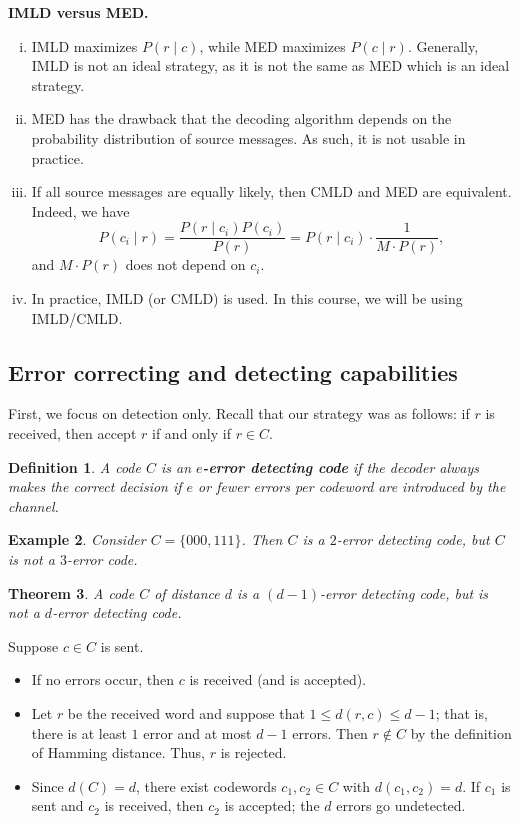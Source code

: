\documentclass[10pt]{article}
\makeatletter
\theoremstyle{newstyle}
\newtheorem{thm}{Theorem}[subsection]
\newtheorem{defn}[thm]{Definition}
\newtheorem{exmp}[thm]{Example}
\newenvironment{pf}[1][\proofname]{\par
  \pushQED{\qed}%
  \normalfont \topsep0\p@\relax
  \trivlist
  \item[\hskip\labelsep\scshape
  #1\@addpunct{.}]\ignorespaces
}{%
  \popQED\endtrivlist\@endpefalse
}
\makeatother
\begin{document}
{\bf IMLD versus MED.}
\begin{enumerate}[(i)]
    \item IMLD maximizes $P(r \mid c)$, while MED maximizes $P(c \mid r)$. Generally, 
    IMLD is not an ideal strategy, as it is not the same as MED which is an ideal strategy.
    \item MED has the drawback that the decoding algorithm depends on the probability 
    distribution of source messages. As such, it is not usable in practice. 
    \item If all source messages are equally likely, then CMLD and MED are equivalent. 
    Indeed, we have 
    \[ P(c_i \mid r) = \frac{P(r \mid c_i) P(c_i)}{P(r)} = P(r \mid c_i) \cdot \frac{1}{M \cdot P(r)}, \]
    and $M \cdot P(r)$ does not depend on $c_i$.
    \item In practice, IMLD (or CMLD) is used. In this course, we will be using IMLD/CMLD.
\end{enumerate}

\subsection{Error correcting and detecting capabilities}

First, we focus on detection only. Recall that our strategy was as follows: 
if $r$ is received, then accept $r$ if and only if $r \in C$. 

\begin{defn}
A code $C$ is an {\bf $e$-error detecting code} if the decoder always makes the correct decision
if $e$ or fewer errors per codeword are introduced by the channel. 
\end{defn}

\begin{exmp}
Consider $C = \{000, 111\}$. Then $C$ is a $2$-error detecting code, but $C$ is not a 
$3$-error code. 
\end{exmp}

\begin{thm}
A code $C$ of distance $d$ is a $(d-1)$-error detecting code, but is not a 
$d$-error detecting code.
\end{thm}
\begin{pf}
Suppose $c \in C$ is sent.
\begin{itemize}
    \item If no errors occur, then $c$ is received (and is accepted).
    \item Let $r$ be the received word and suppose that $1 \leq d(r, c) \leq d-1$; 
    that is, there is at least $1$ error and at most $d-1$ errors. Then 
    $r \notin C$ by the definition of Hamming distance. Thus, $r$ is rejected. 
    \item Since $d(C) = d$, there exist codewords $c_1, c_2 \in C$ with 
    $d(c_1, c_2) = d$. If $c_1$ is sent and $c_2$ is received, then $c_2$ is accepted; 
    the $d$ errors go undetected. \qedhere
\end{itemize}
\end{pf}
\end{document}
